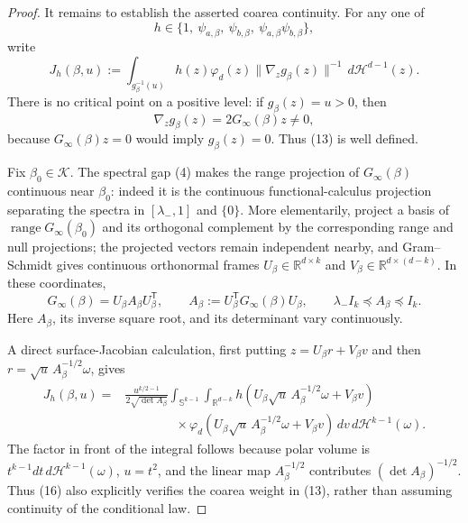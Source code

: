 \documentclass{article}
\begin{document}
\begin{proof}
It remains to establish the asserted coarea continuity.  For any one of
\[
h\in\{1,\ \psi_{a,\beta},\ \psi_{b,\beta},\
\psi_{a,\beta}\psi_{b,\beta}\},
\tag{12}
\]
write
\[
J_h(\beta,u)
:=\int_{g_\beta^{-1}(u)}
h(z)\varphi_d(z)\lVert\nabla_zg_\beta(z)\rVert^{-1}
\,d\mathcal H^{d-1}(z).
\tag{13}
\]
There is no critical point on a positive level: if \(g_\beta(z)=u>0\), then
\[
\nabla_zg_\beta(z)=2G_\infty(\beta)z\neq0,
\tag{14}
\]
because \(G_\infty(\beta)z=0\) would imply \(g_\beta(z)=0\).  Thus (13) is well defined.

Fix \(\beta_0\in\mathcal K\).  The spectral gap (4) makes the range projection of \(G_\infty(\beta)\) continuous near \(\beta_0\): indeed it is the continuous functional-calculus projection separating the spectra in \([\lambda_-,1]\) and \(\{0\}\).  More elementarily, project a basis of \(\operatorname{range}G_\infty(\beta_0)\) and its orthogonal complement by the corresponding range and null projections; the projected vectors remain independent nearby, and Gram--Schmidt gives continuous orthonormal frames \(U_\beta\in\mathbb R^{d\times k}\) and \(V_\beta\in\mathbb R^{d\times(d-k)}\).  In these coordinates,
\[
G_\infty(\beta)
=U_\beta A_\beta U_\beta^{\mathsf T},
\qquad A_\beta:=U_\beta^{\mathsf T}G_\infty(\beta)U_\beta,
\qquad \lambda_-I_k\preceq A_\beta\preceq I_k.
\tag{15}
\]
Here \(A_\beta\), its inverse square root, and its determinant vary continuously.

A direct surface-Jacobian calculation, first putting
\(z=U_\beta r+V_\beta v\) and then
\(r=\sqrt u\,A_\beta^{-1/2}\omega\), gives
\[
\begin{split}
J_h(\beta,u)
={}&\frac{u^{k/2-1}}{2\sqrt{\det A_\beta}}
\int_{\mathbb S^{k-1}}\int_{\mathbb R^{d-k}}
h\!\left(U_\beta\sqrt u\,A_\beta^{-1/2}\omega+V_\beta v\right)\\
&\qquad\qquad\times
\varphi_d\!\left(U_\beta\sqrt u\,A_\beta^{-1/2}\omega+V_\beta v\right)
\,dv\,d\mathcal H^{k-1}(\omega).
\end{split}
\tag{16}
\]
The factor in front of the integral follows because polar volume is
\(t^{k-1}dt\,d\mathcal H^{k-1}(\omega)\), \(u=t^2\), and the linear map \(A_\beta^{-1/2}\) contributes \((\det A_\beta)^{-1/2}\).  Thus (16) also explicitly verifies the coarea weight in (13), rather than assuming continuity of the conditional law.


\end{proof}
\end{document}
